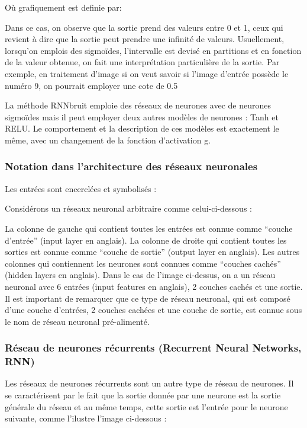 \documentclass[conference,onecolumn]{IEEEtran}
\begin{document}

Où  %
grafiquement est definie par:

Dans ce cas, on observe que la sortie prend des valeurs entre 0 et 1, ceux qui revient à dire que la sortie peut prendre une infinité de valeurs. Usuellement, lorsqu’on emplois des sigmoïdes, l’intervalle est devisé en partitions et en fonction de la valeur obtenue, on fait une interprétation particulière de la sortie. Par exemple, en traitement d’image si on veut savoir si l’image d’entrée possède le numéro 9, on pourrait employer une cote de 0.5  


La méthode RNNbruit emploie des réseaux de neurones avec de neurones sigmoïdes mais il peut employer deux autres modèles de neurones : Tanh et RELU. Le comportement et la description de ces modèles est exactement le même, avec un changement de la fonction d’activation g. 


\subsubsection{Notation dans l’architecture des réseaux neuronales}
Les entrées sont encerclées et symbolisés : 



Considérons un réseaux neuronal arbitraire comme celui-ci-dessous : 


La colonne de gauche qui contient toutes les entrées est connue comme “couche d’entrée” (input layer en anglais). La colonne de droite qui contient toutes les sorties est connue comme “couche de sortie” (output layer en anglais). Les autres colonnes qui contiennent les neurones sont connues comme “couches cachés” (hidden layers en anglais). Dans le cas de l’image ci-dessus, on a un réseau neuronal avec 6 entrées (input features en anglais), 2 couches cachés et une sortie.  Il est important de remarquer que ce type de réseau neuronal, qui est composé d’une couche d’entrées, 2 couches cachées et une couche de sortie, est connue sous le nom de réseau neuronal pré-alimenté. 

\subsubsection{Réseau de neurones récurrents (Recurrent Neural Networks, RNN)}

Les réseaux de neurones récurrents sont un autre type de réseau de neurones. Il se caractérisent par le fait que la sortie donnée par une neurone est la sortie générale du réseau et au même temps, cette sortie est l’entrée pour le neurone suivante, comme l'ilustre l'image ci-dessous : 
\end{document}
